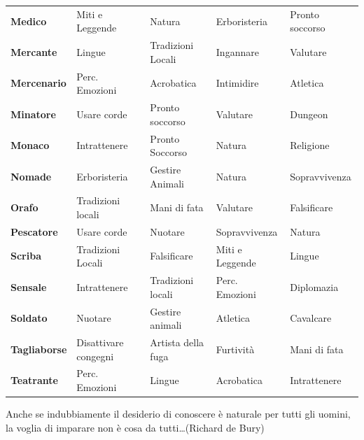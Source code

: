 \begin{tabularx}{\linewidth}{X|l|l|l|l}
\rowcolor{gray!20}\textbf{Medico}& Miti e Leggende&Natura&Erboristeria&Pronto soccorso\\
\textbf{Mercante}& Lingue&Tradizioni Locali&Ingannare&Valutare\\
\rowcolor{gray!20}\textbf{Mercenario} & Perc. Emozioni & Acrobatica & Intimidire & Atletica\\
\textbf{Minatore}& Usare corde&Pronto soccorso&Valutare&Dungeon\\
\rowcolor{gray!20}\textbf{Monaco} & Intrattenere &Pronto Soccorso & Natura & Religione\\
\textbf{Nomade}&  Erboristeria& Gestire Animali & Natura &  Sopravvivenza\\
\rowcolor{gray!20}\textbf{Orafo} & Tradizioni locali & Mani di fata & Valutare & Falsificare\\
\textbf{Pescatore}& Usare corde&Nuotare&Sopravvivenza&Natura\\
\rowcolor{gray!20}\textbf{Scriba} &Tradizioni Locali& Falsificare & Miti e Leggende & Lingue\\
\textbf{Sensale} & Intrattenere & Tradizioni locali & Perc. Emozioni & Diplomazia\\
\rowcolor{gray!20}\textbf{Soldato}& Nuotare&Gestire animali&Atletica&Cavalcare\\
\textbf{Tagliaborse} & Disattivare congegni&Artista della fuga&Furtività&Mani di fata\\
\rowcolor{gray!20}\textbf{Teatrante}& Perc. Emozioni& Lingue&Acrobatica&Intrattenere\\
\end{tabularx}

\vfill

\begin{enfasi}{
Anche se indubbiamente il desiderio di conoscere è naturale per tutti gli uomini, la voglia di imparare non è cosa da tutti…(Richard de Bury)
}\end{enfasi}

